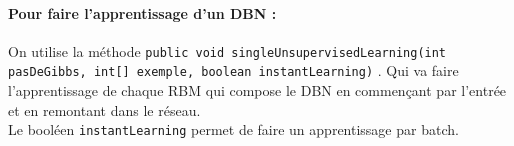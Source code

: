 \documentclass[a4paper,oneside]{report}
\begin{document}
\paragraph*{Pour faire l'apprentissage d'un DBN :} On utilise la méthode \texttt{public void singleUnsupervisedLearning(int pasDeGibbs, int[] exemple, boolean instantLearning)} . Qui va faire l'apprentissage de chaque RBM qui compose le DBN en commençant par l'entrée et en remontant dans le réseau.\\
Le booléen \texttt{instantLearning} permet de faire un apprentissage par batch.
\end{document}
